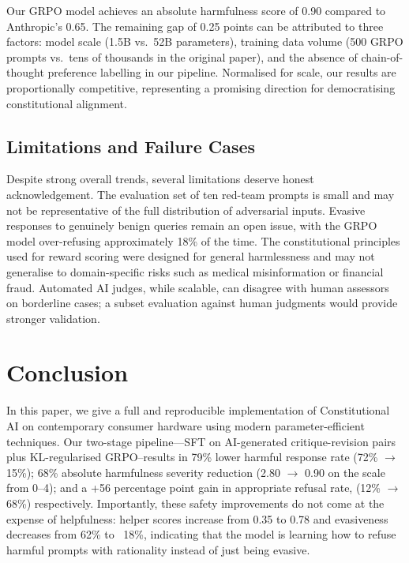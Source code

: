 \documentclass[conference]{IEEEtran}
\begin{document}
Our GRPO model achieves an absolute harmfulness score of 0.90 compared to Anthropic's 0.65. The remaining gap of 0.25 points can be attributed to three factors: model scale (1.5B vs.~52B parameters), training data volume (500 GRPO prompts vs.~tens of thousands in the original paper), and the absence of chain-of-thought preference labelling in our pipeline. Normalised for scale, our results are proportionally competitive, representing a promising direction for democratising constitutional alignment.

\subsection{Limitations and Failure Cases}

Despite strong overall trends, several limitations deserve honest acknowledgement. The evaluation set of ten red-team prompts is small and may not be representative of the full distribution of adversarial inputs. Evasive responses to genuinely benign queries remain an open issue, with the GRPO model over-refusing approximately 18\% of the time. The constitutional principles used for reward scoring were designed for general harmlessness and may not generalise to domain-specific risks such as medical misinformation or financial fraud. Automated AI judges, while scalable, can disagree with human assessors on borderline cases; a subset evaluation against human judgments would provide stronger validation.


\section{Conclusion}

In this paper, we give a full and reproducible implementation of Constitutional AI on contemporary consumer hardware using modern parameter-efficient techniques. Our two-stage pipeline---SFT on AI-generated critique-revision pairs plus KL-regularised GRPO--results in 79\% lower harmful response rate (72\% $\to$ 15\%); 68\% absolute harmfulness severity reduction (2.80 $\to$ 0.90 on the scale from 0--4); and a +56 percentage point gain in appropriate refusal rate, (12\% $\to$ 68\%) respectively. Importantly, these safety improvements do not come at the expense of helpfulness: helper scores increase from 0.35 to 0.78 and evasiveness decreases from 62\% to ~18\%, indicating that the model is learning how to refuse harmful prompts with rationality instead of just being evasive.
\end{document}

